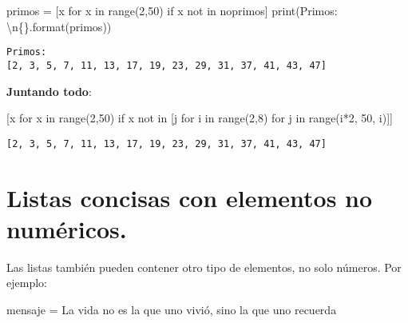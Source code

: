 \documentclass[
  letterpaper,
  DIV=11,
  numbers=noendperiod]{scrreprt}
\newenvironment{Shaded}{\begin{snugshade}}{\end{snugshade}}
\newcommand{\BuiltInTok}[1]{\textcolor[rgb]{0.00,0.23,0.31}{#1}}
\newcommand{\CharTok}[1]{\textcolor[rgb]{0.13,0.47,0.30}{#1}}
\newcommand{\ControlFlowTok}[1]{\textcolor[rgb]{0.00,0.23,0.31}{#1}}
\newcommand{\DecValTok}[1]{\textcolor[rgb]{0.68,0.00,0.00}{#1}}
\newcommand{\KeywordTok}[1]{\textcolor[rgb]{0.00,0.23,0.31}{#1}}
\newcommand{\NormalTok}[1]{\textcolor[rgb]{0.00,0.23,0.31}{#1}}
\newcommand{\OperatorTok}[1]{\textcolor[rgb]{0.37,0.37,0.37}{#1}}
\newcommand{\SpecialCharTok}[1]{\textcolor[rgb]{0.37,0.37,0.37}{#1}}
\newcommand{\StringTok}[1]{\textcolor[rgb]{0.13,0.47,0.30}{#1}}
\begin{document}
\begin{Shaded}
\begin{Highlighting}[]
\NormalTok{primos }\OperatorTok{=}\NormalTok{ [x }\ControlFlowTok{for}\NormalTok{ x }\KeywordTok{in} \BuiltInTok{range}\NormalTok{(}\DecValTok{2}\NormalTok{,}\DecValTok{50}\NormalTok{) }\ControlFlowTok{if}\NormalTok{ x }\KeywordTok{not} \KeywordTok{in}\NormalTok{ noprimos]}
\BuiltInTok{print}\NormalTok{(}\StringTok{\textquotesingle{}Primos: }\CharTok{\textbackslash{}n}\SpecialCharTok{\{\}}\StringTok{\textquotesingle{}}\NormalTok{.}\BuiltInTok{format}\NormalTok{(primos))}
\end{Highlighting}
\end{Shaded}

\begin{verbatim}
Primos: 
[2, 3, 5, 7, 11, 13, 17, 19, 23, 29, 31, 37, 41, 43, 47]
\end{verbatim}

\textbf{Juntando todo}:

\begin{Shaded}
\begin{Highlighting}[]
\NormalTok{[x }\ControlFlowTok{for}\NormalTok{ x }\KeywordTok{in} \BuiltInTok{range}\NormalTok{(}\DecValTok{2}\NormalTok{,}\DecValTok{50}\NormalTok{) }\ControlFlowTok{if}\NormalTok{ x }\KeywordTok{not} \KeywordTok{in}\NormalTok{ [j }\ControlFlowTok{for}\NormalTok{ i }\KeywordTok{in} \BuiltInTok{range}\NormalTok{(}\DecValTok{2}\NormalTok{,}\DecValTok{8}\NormalTok{) }\ControlFlowTok{for}\NormalTok{ j }\KeywordTok{in} \BuiltInTok{range}\NormalTok{(i}\OperatorTok{*}\DecValTok{2}\NormalTok{, }\DecValTok{50}\NormalTok{, i)]]}
\end{Highlighting}
\end{Shaded}

\begin{verbatim}
[2, 3, 5, 7, 11, 13, 17, 19, 23, 29, 31, 37, 41, 43, 47]
\end{verbatim}

\section{Listas concisas con elementos no
numéricos.}\label{listas-concisas-con-elementos-no-numuxe9ricos.}

Las listas también pueden contener otro tipo de elementos, no solo
números. Por ejemplo:

\begin{Shaded}
\begin{Highlighting}[]
\NormalTok{mensaje }\OperatorTok{=} \StringTok{\textquotesingle{}La vida no es la que uno vivió, sino la que uno recuerda\textquotesingle{}}
\end{Highlighting}
\end{Shaded}
\end{document}
